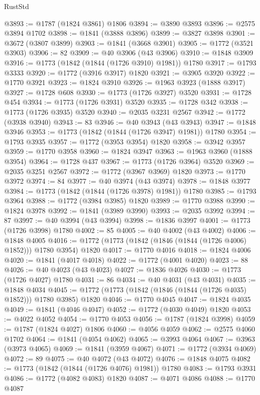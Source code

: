 \begin{lexlean}{RustStd}
\begin{coremodule}
@3893 := @1787 (@1824 @3861) @1806
@3894 := @3890 @3893
@3896 := @2575 @3894 @1702
@3898 := @1841 (@3888 @3896)
@3899 := @3827 @3898
@3901 := @3672 (@3807 @3899)
@3903 := @1841 (@3668 @3901)
@3905 := @1772 (@3521 @3903)
@3906 := 82
@3909 := @40 @3906 (@43 @3906)
@3910 := @1848 @3909
@3916 := @1773 (@1842 (@1844 (@1726 @3910) @1981)) @1780
@3917 := @1793 @3333
@3920 := @1772 (@3916 @3917) @1820
@3921 := @3905 @3920
@3922 := @1770 @3921
@3923 := @1824 @3910
@3926 := @1963 @3923 (@1888 @3917)
@3927 := @1728 @608
@3930 := @1773 (@1726 @3927) @3520
@3931 := @1728 @454
@3934 := @1773 (@1726 @3931) @3520
@3935 := @1728 @342
@3938 := @1773 (@1726 @3935) @3520
@3940 := @2035 @3231 @2567
@3942 := @1772 (@3938 @3940)
@3943 := 83
@3946 := @40 @3943 (@43 @3943)
@3947 := @1848 @3946
@3953 := @1773 (@1842 (@1844 (@1726 @3947) @1981)) @1780
@3954 := @1793 @3935
@3957 := @1772 (@3953 @3954) @1820
@3958 := @3942 @3957
@3959 := @1770 @3958
@3960 := @1824 @3947
@3963 := @1963 @3960 (@1888 @3954)
@3964 := @1728 @437
@3967 := @1773 (@1726 @3964) @3520
@3969 := @2035 @3251 @2567
@3972 := @1772 (@3967 @3969) @1820
@3973 := @1770 @3972
@3974 := 84
@3977 := @40 @3974 (@43 @3974)
@3978 := @1848 @3977
@3984 := @1773 (@1842 (@1844 (@1726 @3978) @1981)) @1780
@3985 := @1793 @3964
@3988 := @1772 (@3984 @3985) @1820
@3989 := @1770 @3988
@3990 := @1824 @3978
@3992 := @1841 (@3989 @3990)
@3993 := @2035 @3992
@3994 := 87
@3997 := @40 @3994 (@43 @3994)
@3998 := @1836 @3997
@4001 := @1773 (@1726 @3998) @1780
@4002 := 85
@4005 := @40 @4002 (@43 @4002)
@4006 := @1848 @4005
@4016 := @1772 (@1773 (@1842 (@1846 (@1844 (@1726 @4006) @1852))) @1780 @3954) @1820
@4017 := @1770 @4016
@4018 := @1824 @4006
@4020 := @1841 (@4017 @4018)
@4022 := @1772 (@4001 @4020)
@4023 := 88
@4026 := @40 @4023 (@43 @4023)
@4027 := @1836 @4026
@4030 := @1773 (@1726 @4027) @1780
@4031 := 86
@4034 := @40 @4031 (@43 @4031)
@4035 := @1848 @4034
@4045 := @1772 (@1773 (@1842 (@1846 (@1844 (@1726 @4035) @1852))) @1780 @3985) @1820
@4046 := @1770 @4045
@4047 := @1824 @4035
@4049 := @1841 (@4046 @4047)
@4052 := @1772 (@4030 @4049) @1820
@4053 := @4022 @4052
@4054 := @1770 @4053
@4056 := @1787 (@1824 @3998)
@4059 := @1787 (@1824 @4027) @1806
@4060 := @4056 @4059
@4062 := @2575 @4060 @1702
@4064 := @1841 (@4054 @4062)
@4065 := @3993 @4064
@4067 := @3963 (@3973 @4065)
@4069 := @1841 (@3959 @4067)
@4071 := @1772 (@3934 @4069)
@4072 := 89
@4075 := @40 @4072 (@43 @4072)
@4076 := @1848 @4075
@4082 := @1773 (@1842 (@1844 (@1726 @4076) @1981)) @1780
@4083 := @1793 @3931
@4086 := @1772 (@4082 @4083) @1820
@4087 := @4071 @4086
@4088 := @1770 @4087

\end{coremodule}
\end{lexlean}
